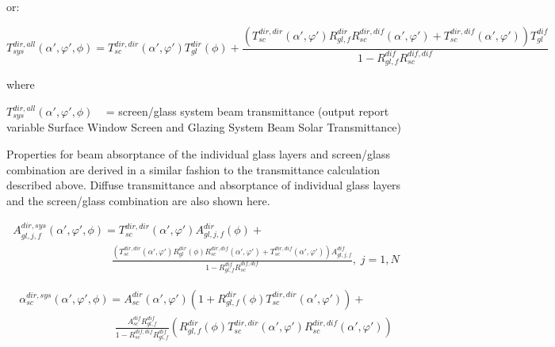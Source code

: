 or:

\begin{equation}
T_{sys}^{dir,all}(\alpha ',\varphi ',\phi ) = T_{sc}^{dir,dir}(\alpha ',\varphi ')T_{gl}^{dir}\left( \phi  \right) + \frac{{(T_{sc}^{dir,dir}(\alpha ',\varphi ')R_{gl,f}^{dir}R_{sc}^{dir,dif}(\alpha ',\varphi ') + T_{sc}^{dir,dif}(\alpha ',\varphi '))T_{gl}^{dif}}}{{1 - R_{gl,f}^{dif}R_{sc}^{dif,dif}}}
\end{equation}

where

\(T_{sys}^{dir,all}(\alpha ',\varphi ',\phi )\) ~ = screen/glass system beam transmittance (output report variable Surface Window Screen and Glazing System Beam Solar Transmittance)

Properties for beam absorptance of the individual glass layers and screen/glass combination are derived in a similar fashion to the transmittance calculation described above. Diffuse transmittance and absorptance of individual glass layers and the screen/glass combination are also shown here.

\begin{equation}
\begin{array}{l}A_{gl,j,f}^{dir,sys}\left( {\alpha ',\varphi ',\phi } \right) = T_{sc}^{dir,dir}\left( {\alpha ',\varphi '} \right)A_{gl,j,f}^{dir}\left( \phi \right) + \\\;\;\;\;\;\;\;\;\;\;\;\;\;\;\,\,\,\,\,\,\,\,\,\,\,\,\,\,\,\,\,\,\,\,\;\;\;\;\;\;\frac{{\left( {T_{sc}^{dir,dir}\left( {\alpha ',\varphi '} \right)R_{gl}^{dir}\left( \phi \right)R_{sc}^{dir,dif}\left( {\alpha ',\varphi '} \right) + T_{sc}^{dir,dif}\left( {\alpha ',\varphi '} \right)} \right)A_{gl,j,f}^{dif}}}{{1 - R_{gl,f}^{dif}R_{sc}^{dif,dif}}},\;j = 1,N\end{array}
\end{equation}

\begin{equation}
\begin{array}{l}\alpha_{sc}^{dir,sys}\left( {\alpha ',\varphi ',\phi } \right) = A_{sc}^{dir}\left( {\alpha ',\varphi '} \right)\left( {1 + R_{gl,f}^{dir}\left( \phi \right)T_{sc}^{dir,dir}\left( {\alpha ',\varphi '} \right)} \right) + \\\;\;\;\;\;\;\;\;\;\;\;\;\;\;\;\;\;\;\;\;\;\;\;\;\;\;\;\;\;\;\;\frac{{A_{sc}^{dif}R_{gl,f}^{dif}}}{{1 - R_{sc}^{dif,dif}R_{gl,f}^{dif}}}\left( {R_{gl,f}^{dir}\left( \phi \right)T_{sc}^{dir,dir}\left( {\alpha ',\varphi '} \right)R_{sc}^{dir,dif}\left( {\alpha ',\varphi '} \right)} \right)\end{array}
\end{equation}

